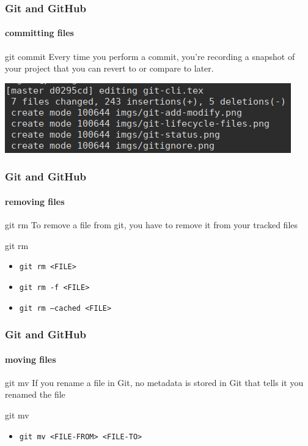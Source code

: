 \begin{frame}
	\frametitle{Git and GitHub}
    \framesubtitle{committing files}
    \addtocounter{nframe}{1}

	\begin{block}{git commit}
		Every time you perform a commit, you’re recording a snapshot of your project that you can revert to or compare to later.
	\end{block}

	\begin{center}
		\includegraphics[width=.8\textwidth]{imgs/git-commit.png}
	\end{center}

\end{frame}

\begin{frame}
	\frametitle{Git and GitHub}
    \framesubtitle{removing files}
    \addtocounter{nframe}{1}

	\begin{block}{git rm}
		To remove a file from git, you have to remove it from your tracked files
	\end{block}

	\begin{block}{git rm}
		\begin{itemize}
			\item \texttt{git rm <FILE>}
			\item \texttt{git rm -f <FILE>}
			\item \texttt{git rm --cached <FILE>}
		\end{itemize}
	
	\end{block}

\end{frame}

\begin{frame}
	\frametitle{Git and GitHub}
    \framesubtitle{moving files}
    \addtocounter{nframe}{1}

	\begin{block}{git mv}
		If you rename a file in Git, no metadata is stored in Git that tells it you renamed the file
	\end{block}

	\begin{block}{git mv}
		\begin{itemize}
			\item \texttt{git mv <FILE-FROM> <FILE-TO>}
		\end{itemize}
	\end{block}

\end{frame}

